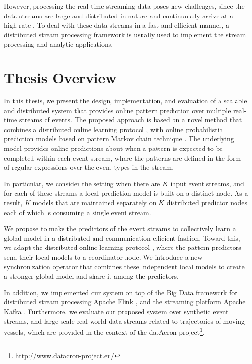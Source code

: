\par However, processing the real-time streaming data poses new challenges, since the data streams are large and distributed in nature and continuously arrive at a high rate \cite{Babcock2002,Flouris2017}. To deal with these data streams in a fast and efficient manner, a distributed stream processing framework \cite{Spark,Flink,Storm} is usually used to implement the stream processing and analytic applications. 


\section{Thesis Overview}
\par In this thesis, we present the design, implementation, and evaluation of a scalable and distributed system that provides online pattern prediction over multiple real-time streams of events. The proposed approach is based on a novel method that combines a distributed online learning protocol \cite{kamp2014communication}, with online probabilistic prediction models based on pattern Markov chain technique \cite{alevizos2017event}. The underlying model provides online predictions about when a pattern is expected to be completed within each event stream, where the patterns are defined in the form of regular expressions over the event types in the stream.

\par In particular, we consider the setting when there are \emph{$K$} input event streams, and for each of these streams a local prediction model is built on a distinct node. As a result, \emph{$K$} models that are maintained separately on \emph{$K$} distributed predictor nodes each of which is consuming a single event stream.


 \par We propose to make the predictors of the event streams to collectively learn a global model in a distributed and communication-efficient fashion. Toward this, we adapt the distributed online learning protocol \cite{kamp2014communication}, where the pattern predictors \cite{alevizos2017event} send their local models to a coordinator node. We introduce a new synchronization operator that combines these independent local models to create a stronger global model and share it among the predictors.
  

\par In addition, we implemented our system on top of the Big Data framework for distributed stream processing Apache Flink \cite{Flink}, and the streaming platform Apache Kafka \cite{Kafka}. Furthermore, we evaluate our proposed system over synthetic event streams, and large-scale real-world data streams related to trajectories of moving vessels, which are provided in the context of the datAcron project\footnote{\url{http://www.datacron-project.eu/}}.\\

